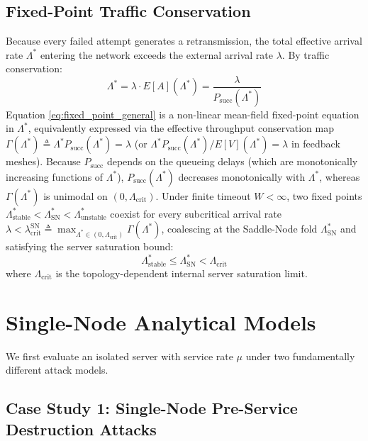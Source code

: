 \documentclass[12pt,onecolumn]{article}
\begin{document}
\subsection{Fixed-Point Traffic Conservation}
Because every failed attempt generates a retransmission, the total effective arrival rate $\Lambda^*$ entering the network exceeds the external arrival rate $\lambda$. By traffic conservation:
\begin{equation}
\Lambda^* = \lambda \cdot E[A](\Lambda^*) = \frac{\lambda}{P_{\text{succ}}(\Lambda^*)}
\label{eq:fixed_point_general}
\end{equation}
Equation \eqref{eq:fixed_point_general} is a non-linear mean-field fixed-point equation in $\Lambda^*$, equivalently expressed via the effective throughput conservation map $\Gamma(\Lambda^*) \triangleq \Lambda^* P_{\text{succ}}(\Lambda^*) = \lambda$ (or $\Lambda^* P_{\text{succ}}(\Lambda^*)/E[V](\Lambda^*) = \lambda$ in feedback meshes). Because $P_{\text{succ}}$ depends on the queueing delays (which are monotonically increasing functions of $\Lambda^*$), $P_{\text{succ}}(\Lambda^*)$ decreases monotonically with $\Lambda^*$, whereas $\Gamma(\Lambda^*)$ is unimodal on $(0, \Lambda_{\text{crit}})$. Under finite timeout $W < \infty$, two fixed points $\Lambda_{\text{stable}}^* < \Lambda_{\text{SN}}^* < \Lambda_{\text{unstable}}^*$ coexist for every subcritical arrival rate $\lambda < \lambda_{\text{crit}}^{\text{SN}} \triangleq \max_{\Lambda^* \in (0, \Lambda_{\text{crit}})} \Gamma(\Lambda^*)$, coalescing at the Saddle-Node fold $\Lambda_{\text{SN}}^*$ and satisfying the server saturation bound:
\begin{equation}
\Lambda_{\text{stable}}^* \le \Lambda_{\text{SN}}^* < \Lambda_{\text{crit}}
\end{equation}
where $\Lambda_{\text{crit}}$ is the topology-dependent internal server saturation limit.

\section{Single-Node Analytical Models}
We first evaluate an isolated server with service rate $\mu$ under two fundamentally different attack models.

\subsection{Case Study 1: Single-Node Pre-Service Destruction Attacks}
\end{document}
